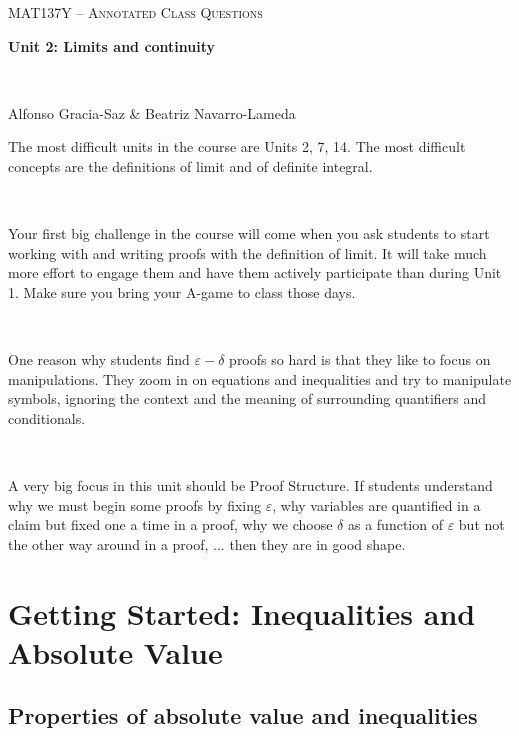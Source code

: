 \documentclass[11pt]{article}
\newcommand{\n}{\newpage}
\newcommand{\e}{\varepsilon}
\begin{document}
\thispagestyle{empty}
	\begin{center}
		{ {\LARGE  \scshape
		\textcolor{137cp3}{MAT137Y --   Annotated Class Questions}
		}
		
		\medskip
		{\bf \Large \textcolor{137cp1}{Unit 2: Limits and continuity
		}}
		
		\
		
		\medskip
		{\large
		\textcolor{137cp1}{Alfonso Gracia-Saz \& Beatriz Navarro-Lameda}
		}}
	\end{center}

\vspace{5mm}

The most difficult units in the course are Units 2, 7, 14.  The most difficult concepts are the definitions of limit and of definite integral.

\

Your first big challenge in the course will come when you ask students to start working with and writing proofs with the definition of limit.  It will take much more effort to engage them and have them actively participate than during Unit 1.  Make sure you bring your A-game to class those days.

\

One reason why students find $\e-\delta$ proofs so hard is that they like to focus on manipulations.  They zoom in on equations and inequalities and try to manipulate symbols, ignoring the context and the meaning of surrounding quantifiers and conditionals.

\

A very big focus in this unit should be Proof Structure.  If students understand why we must begin some proofs by fixing $\e$, why variables are quantified in a claim but fixed one a time in a proof, why we choose $\delta$ as a function of $\e$ but not the other way around in a proof, ... then they are in good shape.

\n

\tableofcontents

\newpage
\section{Getting Started: Inequalities and Absolute Value}
\subsection{Properties of absolute value and inequalities} 
\end{document}
